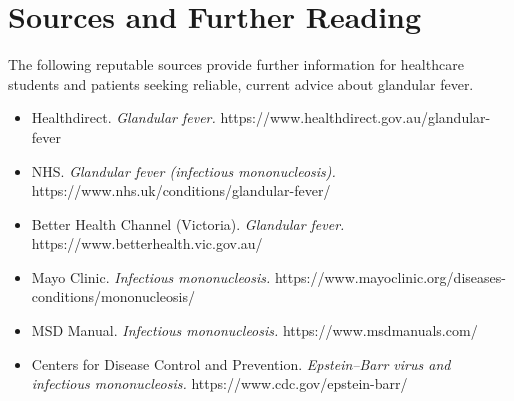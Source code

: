 \section*{Sources and Further Reading}
The following reputable sources provide further information for healthcare students and patients seeking reliable, current advice about glandular fever.
\begin{itemize}
    \item Healthdirect. \textit{Glandular fever.} https://www.healthdirect.gov.au/glandular-fever
    \item NHS. \textit{Glandular fever (infectious mononucleosis).} https://www.nhs.uk/conditions/glandular-fever/
    \item Better Health Channel (Victoria). \textit{Glandular fever.} https://www.betterhealth.vic.gov.au/
    \item Mayo Clinic. \textit{Infectious mononucleosis.} https://www.mayoclinic.org/diseases-conditions/mononucleosis/
    \item MSD Manual. \textit{Infectious mononucleosis.} https://www.msdmanuals.com/
    \item Centers for Disease Control and Prevention. \textit{Epstein--Barr virus and infectious mononucleosis.} https://www.cdc.gov/epstein-barr/
\end{itemize}
